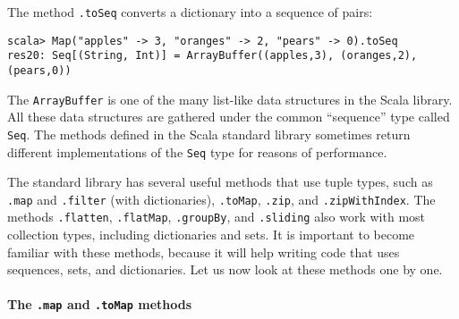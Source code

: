 The method \lstinline!.toSeq!
converts a dictionary into a sequence of pairs:
\begin{lstlisting}
scala> Map("apples" -> 3, "oranges" -> 2, "pears" -> 0).toSeq
res20: Seq[(String, Int)] = ArrayBuffer((apples,3), (oranges,2), (pears,0))
\end{lstlisting}
The \lstinline!ArrayBuffer!
is one of the many list-like data structures in the Scala library.
All these data structures are gathered under the common ``sequence''
type called \lstinline!Seq!.
The methods defined in the Scala standard library sometimes return
different implementations of the \lstinline!Seq!
type for reasons of performance.

The standard library has several useful methods that use tuple types,
such as \lstinline!.map!
and \lstinline!.filter!
(with dictionaries), \lstinline!.toMap!,
\lstinline!.zip!, and \lstinline!.zipWithIndex!.
The methods \lstinline!.flatten!,
\lstinline!.flatMap!, \lstinline!.groupBy!,
and \lstinline!.sliding!
also work with most collection types, including dictionaries and sets.
It is important to become familiar with these methods, because it
will help writing code that uses sequences, sets, and dictionaries.
Let us now look at these methods one by one.

\paragraph*{The \lstinline!.map! and
\lstinline!.toMap! methods}

